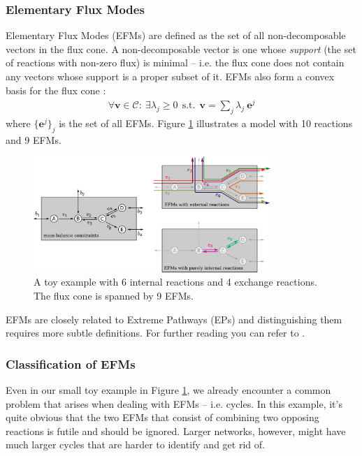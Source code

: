 \documentclass[10pt,a4paper]{article}
\newcommand{\myvector}[1]{{\boldsymbol{#1}}}
\newcommand{\fluxcone}{\mathcal{C}}
\begin{document}
\subsubsection{Elementary Flux Modes}
Elementary Flux Modes (EFMs) are defined as the set of all non-decomposable vectors in the flux cone. A non-decomposable vector is one whose \textit{support} (the set of reactions with non-zero flux) is minimal -- i.e. the flux cone does not contain any vectors whose support is a proper subset of it. EFMs also form a convex basis for the flux cone \cite{schilling_theory_2000}:
\begin{eqnarray}
\forall \myvector{v} \in \fluxcone:~ \exists \lambda_j \geq 0 ~~\text{s.t.}~~ \myvector{v} = \sum_j \lambda_j~\myvector{e}^j
\end{eqnarray}
where $\{\myvector{e}^j\}_j$ is the set of all EFMs. Figure \ref{fig:toy1} illustrates a model with 10 reactions and 9 EFMs.
\begin{figure}[ht!]
	\begin{center}
	\includegraphics[width=0.8\textwidth]{toy1}
	\caption{A toy example with 6 internal reactions and 4 exchange reactions. The flux cone is spanned by 9 EFMs.}\label{fig:toy1}
	\end{center}
\end{figure}

EFMs are closely related to Extreme Pathways (EPs) and distinguishing them requires more subtle definitions. For further reading you can refer to \cite{klamt_two_2003}.

\subsubsection{Classification of EFMs}
Even in our small toy example in Figure \ref{fig:toy1}, we already encounter a common problem that arises when dealing with EFMs -- i.e. cycles. In this example, it's quite obvious that the two EFMs that consist of combining two opposing reactions is futile and should be ignored. Larger networks, however, might have much larger cycles that are harder to identify and get rid of.
\end{document}
